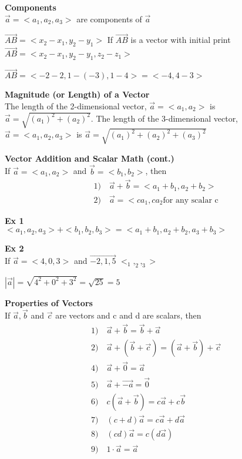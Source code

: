 \documentclass{article}
\begin{document}
  \textbf{Components}\\
  $\vec{a} = <a_1,a_2,a_3>$ are components of $\vec{a}$

  $\vec{AB}=<x_2-x_1,y_2-y_1>$
  If $ \vec{AB} $ is a vector with initial print\\
  $ \vec{AB} = <x_2-x_1,y_2-y_1,z_2-z_1>$ 

  $ \vec{AB} = <-2-2,1-(-3),1-4 > = \boxed{<-4,4-3>}$

  \textbf{Magnitude (or Length) of a Vector}\\
  The length of the 2-dimensional vector, $ \vec{a} = <a_1,a_2>$ is $\vec{a}=\sqrt{(a_1)^2+(a_2)^2}$. The length of the 3-dimensional vector, $ \vec{a} = <a_1,a_2,a_3> $ is $\vec{a}=\sqrt{(a_1)^2+(a_2)^2+(a_3)^2}$

  \textbf{Vector Addition and Scalar Math (cont.)}\\
  If $ \vec{a} = <a_1,a_2> $ and $ \vec{b}=<b_1,b_2> $, then 
  \[
    \begin{aligned}
  &1) \quad  \vec{a} + \vec{b}=<a_1+b_1,a_2+b_2>\\ 
  &2) \quad  \vec{a} = <ca_1,ca_2  \text{for any scalar c}
    \end{aligned}
  \]

  \textbf{Ex 1}\\
  $ <a_1,a_2,a_3 > + <b_1,b_2,b_3>=<a_1+b_1,a_2+b_2,a_3+b_3>$

  \textbf{Ex 2}\\
  If $ \vec{a} = <4,0,3> $ and $ \vec{-2,1,5} $
  $ <_1, _2, _3> $

  $ | \vec{a} | = \sqrt{4^2+0^2+3^2} = \sqrt{25}=\boxed{5}$

  \textbf{Properties of Vectors}\\
  If $ \vec{a}, \vec{b} $ and $ \vec{c} $ are vectors and c and d are scalars, then
  \[
    \begin{aligned}
      &1) \quad \vec{a}+ \vec{b} = \vec{b} + \vec{a}\\
      &2) \quad \vec{a}+ ( \vec{b} + \vec{c}) = ( \vec{a}+ \vec{b} ) + \vec{c}\\
      &4) \quad  \vec{a} + \vec{0}= \vec{a}\\
      &5) \quad  \vec{a}+ \vec{-a}= \vec{0}\\
      &6) \quad  c( \vec{a}+ \vec{b}) = c \vec{a}+ c \vec{b}\\
      &7) \quad  (c+d) \vec{a} = c \vec{a} + d \vec{a}\\
      &8) \quad   (cd)\vec{a} = c(d \vec{a})\\
      &9) \quad   1 \cdot \vec{a} = \vec{a} 
    \end{aligned}
  \]
\end{document}
